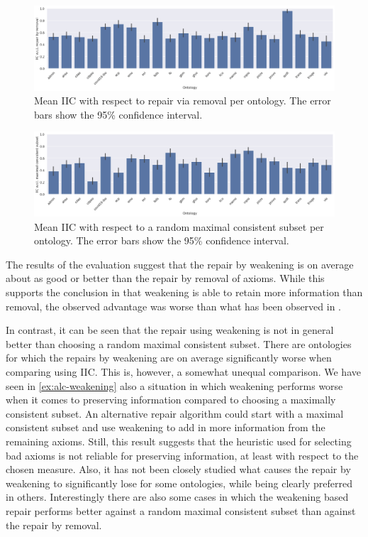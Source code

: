 \begin{figure}[ht]
  \begin{widepage}
    \centering
    \includegraphics[width=\textwidth]{resources/iic-remove-ontology-bar.png}
  \end{widepage}
  \caption{Mean IIC with respect to repair via removal per ontology. The error bars show the 95\% confidence interval.}
  \label{fig:results-remove}
\end{figure}

\begin{figure}[ht]
  \begin{widepage}
    \centering
    \includegraphics[width=\textwidth]{resources/iic-mcs-ontology-bar.png}
  \end{widepage}
  \caption{Mean IIC with respect to a random maximal consistent subset per ontology. The error bars show the 95\% confidence interval.}
  \label{fig:results-mcs}
\end{figure}

The results of the evaluation suggest that the repair by weakening is on average about as good or better than the repair by removal of axioms. While this supports the conclusion in \cite{troquard2018repairing} that weakening is able to retain more information than removal, the observed advantage was worse than what has been observed in \cite{troquard2018repairing}.

In contrast, it can be seen that the repair using weakening is not in general better than choosing a random maximal consistent subset. There are ontologies for which the repairs by weakening are on average significantly worse when comparing using IIC. This is, however, a somewhat unequal comparison. We have seen in \cref{ex:alc-weakening} also a situation in which weakening performs worse when it comes to preserving information compared to choosing a maximally consistent subset. An alternative repair algorithm could start with a maximal consistent subset and use weakening to add in more information from the remaining axioms. Still, this result suggests that the heuristic used for selecting bad axioms is not reliable for preserving information, at least with respect to the chosen measure. Also, it has not been closely studied what causes the repair by weakening to significantly lose for some ontologies, while being clearly preferred in others. Interestingly there are also some cases in which the weakening based repair performs better against a random maximal consistent subset than against the repair by removal.
